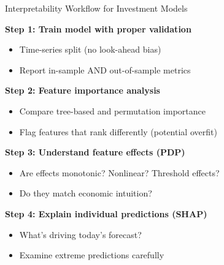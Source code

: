 \documentclass[10pt]{beamer}
\begin{document}
\begin{frame}{Interpretability Workflow for Investment Models}

  \textbf{Step 1: Train model with proper validation}
  \begin{itemize}
    \item Time-series split (no look-ahead bias)
    \item Report in-sample AND out-of-sample metrics
  \end{itemize}

  \vspace{0.3em}
  \textbf{Step 2: Feature importance analysis}
  \begin{itemize}
    \item Compare tree-based and permutation importance
    \item Flag features that rank differently (potential overfit)
  \end{itemize}

  \vspace{0.3em}
  \textbf{Step 3: Understand feature effects (PDP)}
  \begin{itemize}
    \item Are effects monotonic? Nonlinear? Threshold effects?
    \item Do they match economic intuition?
  \end{itemize}

  \vspace{0.3em}
  \textbf{Step 4: Explain individual predictions (SHAP)}
  \begin{itemize}
    \item What's driving today's forecast?
    \item Examine extreme predictions carefully
  \end{itemize}
\end{frame}

\end{document}
